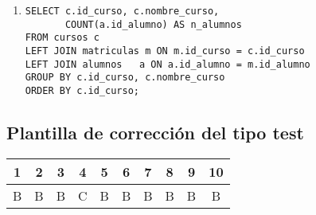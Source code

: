 \documentclass[11pt,a4paper]{article}
\begin{document}
\begin{enumerate}[leftmargin=1.2em,label=\textbf{\arabic*.}]
\item
\begin{lstlisting}
SELECT c.id_curso, c.nombre_curso,
       COUNT(a.id_alumno) AS n_alumnos
FROM cursos c
LEFT JOIN matriculas m ON m.id_curso = c.id_curso
LEFT JOIN alumnos   a ON a.id_alumno = m.id_alumno
GROUP BY c.id_curso, c.nombre_curso
ORDER BY c.id_curso;
\end{lstlisting}
\end{enumerate}

\subsection*{Plantilla de corrección del tipo test}
\begin{center}
\begin{tabular}{cccccccccc}
\toprule
1 & 2 & 3 & 4 & 5 & 6 & 7 & 8 & 9 & 10 \\
\midrule
B & B & B & C & B & B & B & B & B & B \\
\bottomrule
\end{tabular}
\end{center}
\end{document}
